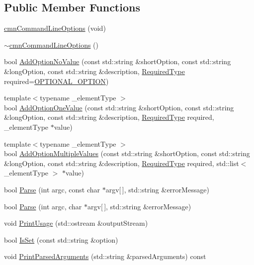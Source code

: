 \subsection*{Public Member Functions}
\begin{DoxyCompactItemize}
\item 
\hyperlink{classcmn_command_line_options_a240f609539b5521aea0ac95ba9753161}{cmn\-Command\-Line\-Options} (void)
\item 
\hyperlink{classcmn_command_line_options_a56acb6ec4ea3fbc95445a1ca6fa08653}{$\sim$cmn\-Command\-Line\-Options} ()
\item 
bool \hyperlink{classcmn_command_line_options_a7d8292a0b9cfcdc97591f55c41598ba5}{Add\-Option\-No\-Value} (const std\-::string \&short\-Option, const std\-::string \&long\-Option, const std\-::string \&description, \hyperlink{classcmn_command_line_options_ac239a3ca62dd4e3b391824f6f1a97c76}{Required\-Type} required=\hyperlink{classcmn_command_line_options_ac239a3ca62dd4e3b391824f6f1a97c76a6734a70bf0045a4c08605f3ae473d533}{O\-P\-T\-I\-O\-N\-A\-L\-\_\-\-O\-P\-T\-I\-O\-N})
\item 
{\footnotesize template$<$typename \-\_\-element\-Type $>$ }\\bool \hyperlink{classcmn_command_line_options_af51a9e7df4d689c7de4daeebce7d313b}{Add\-Option\-One\-Value} (const std\-::string \&short\-Option, const std\-::string \&long\-Option, const std\-::string \&description, \hyperlink{classcmn_command_line_options_ac239a3ca62dd4e3b391824f6f1a97c76}{Required\-Type} required, \-\_\-element\-Type $\ast$value)
\item 
{\footnotesize template$<$typename \-\_\-element\-Type $>$ }\\bool \hyperlink{classcmn_command_line_options_ae8fa287fe01d51d1eb8fdda682b07f26}{Add\-Option\-Multiple\-Values} (const std\-::string \&short\-Option, const std\-::string \&long\-Option, const std\-::string \&description, \hyperlink{classcmn_command_line_options_ac239a3ca62dd4e3b391824f6f1a97c76}{Required\-Type} required, std\-::list$<$ \-\_\-element\-Type $>$ $\ast$value)
\item 
bool \hyperlink{classcmn_command_line_options_a7e6a6a950b408e0769ce9194d9cb65b5}{Parse} (int argc, const char $\ast$argv\mbox{[}$\,$\mbox{]}, std\-::string \&error\-Message)
\item 
bool \hyperlink{classcmn_command_line_options_a89ca67111b2e630f4792aaf43443afd9}{Parse} (int argc, char $\ast$argv\mbox{[}$\,$\mbox{]}, std\-::string \&error\-Message)
\item 
void \hyperlink{classcmn_command_line_options_a09d9261f50374d6178ab8865a16cad99}{Print\-Usage} (std\-::ostream \&output\-Stream)
\item 
bool \hyperlink{classcmn_command_line_options_aba78eaaa4cd80f68e5c64649bae98931}{Is\-Set} (const std\-::string \&option)
\item 
void \hyperlink{classcmn_command_line_options_aee814f6d6181c5ed6b98d0025bd54fe9}{Print\-Parsed\-Arguments} (std\-::string \&parsed\-Arguments) const 
\end{DoxyCompactItemize}
